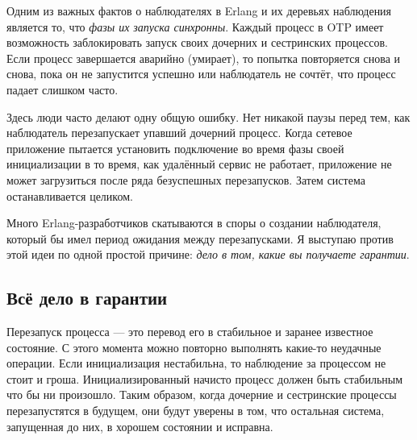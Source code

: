 Одним из важных фактов о наблюдателях в Erlang и их деревьях наблюдения является то, что \emph{фазы их запуска синхронны}. Каждый процесс в OTP имеет возможность заблокировать запуск своих дочерних и сестринских процессов. Если процесс завершается аварийно (умирает), то попытка повторяется снова и снова, пока он не запустится успешно или наблюдатель не сочтёт, что процесс падает слишком часто.

Здесь люди часто делают одну общую ошибку. Нет никакой паузы перед тем, как наблюдатель перезапускает упавший дочерний процесс. Когда сетевое приложение пытается установить подключение во время фазы своей инициализации в то время, как удалённый сервис не работает, приложение не может загрузиться после ряда безуспешных перезапусков. Затем система останавливается целиком.

Много Erlang-разработчиков скатываются в споры о создании наблюдателя, который бы имел период ожидания между перезапусками. Я выступаю против этой идеи по одной простой причине: \emph{дело в том, какие вы получаете гарантии}.

\subsection{Всё дело в гарантии}
\label{subsec:start-link-guarantees}

Перезапуск процесса --- это перевод его в стабильное и заранее известное состояние. С этого момента можно повторно выполнять какие-то неудачные операции. Если инициализация нестабильна, то наблюдение за процессом не стоит и гроша. Инициализированный начисто процесс должен быть стабильным что бы ни произошло. Таким образом, когда дочерние и сестринские процессы перезапустятся в будущем, они будут уверены в том, что остальная система, запущенная до них, в хорошем состоянии и исправна.

